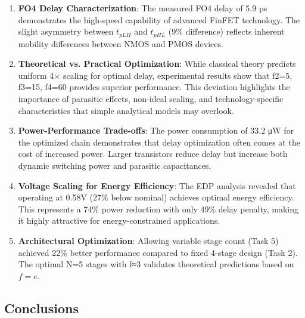 \documentclass[UTF8,12pt,a4paper]{ctexart}
\begin{document}
\begin{enumerate}
    \item \textbf{FO4 Delay Characterization}: The measured FO4 delay of 5.9 ps demonstrates the high-speed capability of advanced FinFET technology. The slight asymmetry between $t_{pLH}$ and $t_{pHL}$ (9\% difference) reflects inherent mobility differences between NMOS and PMOS devices.
    
    \item \textbf{Theoretical vs. Practical Optimization}: While classical theory predicts uniform 4× scaling for optimal delay, experimental results show that f2=5, f3=15, f4=60 provides superior performance. This deviation highlights the importance of parasitic effects, non-ideal scaling, and technology-specific characteristics that simple analytical models may overlook.
    
    \item \textbf{Power-Performance Trade-offs}: The power consumption of 33.2 μW for the optimized chain demonstrates that delay optimization often comes at the cost of increased power. Larger transistors reduce delay but increase both dynamic switching power and parasitic capacitances.
    
    \item \textbf{Voltage Scaling for Energy Efficiency}: The EDP analysis revealed that operating at 0.58V (27\% below nominal) achieves optimal energy efficiency. This represents a 74\% power reduction with only 49\% delay penalty, making it highly attractive for energy-constrained applications.
    
    \item \textbf{Architectural Optimization}: Allowing variable stage count (Task 5) achieved 22\% better performance compared to fixed 4-stage design (Task 2). The optimal N=5 stages with f≈3 validates theoretical predictions based on $f = e$.
\end{enumerate}

\subsection{Conclusions}
\end{document}
